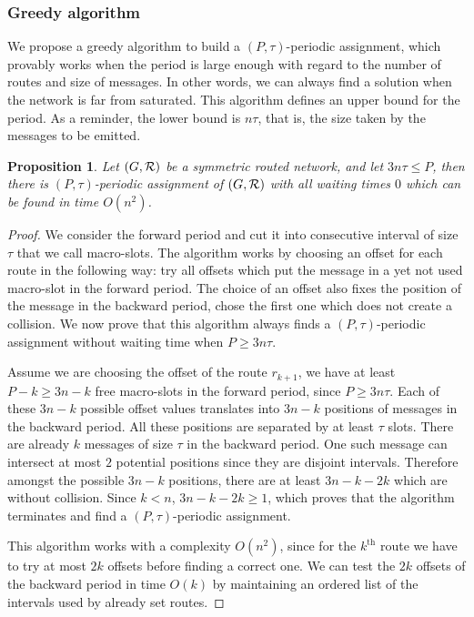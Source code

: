 \documentclass[a4paper,10pt]{article}
\newtheorem{proposition}{Proposition}
\begin{document}
{   
    \subsubsection*{Greedy algorithm}
    
    We propose a greedy algorithm to build a $(P,\tau)$-periodic assignment, which provably works when
    the period is large enough with regard to the number of routes and size of messages. In other words, 
    we can always find a solution when the network is far from saturated. This algorithm defines an upper bound for the period. As a reminder, the lower bound is $n\tau$, that is, the size taken by the messages to be emitted.
    
    \begin{proposition}
     Let $(G, {\cal R})$ be a symmetric routed network, and let $ 3n\tau \leq P$, then there is $(P,\tau)$-periodic assignment of $(G, {\cal R})$ with all waiting times $0$ which can be found in time $O(n^2)$.
    \end{proposition}
    \begin{proof}
     We consider the forward period and cut it into consecutive interval of size $\tau$ that we call macro-slots. The algorithm works by choosing an offset for each route in the following way: try all offsets which put the message in a yet not used macro-slot in the forward
     period. The choice of an offset also fixes the position of the message in the backward period, chose the first one which does not create a collision. We now prove that this algorithm always finds a $(P,\tau)$-periodic assignment without waiting time when $P \geq 3n\tau$.
     
     Assume we are choosing the offset of the route $r_{k+1}$, we have at least $P - k \geq 3n - k$ free macro-slots in the forward period, since $P \geq 3n\tau$. Each of these $3n - k$ possible offset values translates into $3n - k$ positions of messages in the backward period. All these positions are separated by at least $\tau$ slots. There are already $k$ messages of size $\tau$ in the backward period. One such message can intersect at most $2$ potential positions since they are disjoint intervals. Therefore  amongst the possible $3n - k$ positions, there are  at least $3n - k -2k$ which are without collision. Since $k < n$, $3n - k -2k \geq 1$, which proves that the algorithm terminates and find a  $(P,\tau)$-periodic assignment. 
     
     This algorithm works with a complexity $O(n^2)$, since for the $k^{\text{th}}$ route we have to try at most $2k$ offsets before finding a correct one. We can test the $2k$ offsets of the backward period in time $O(k)$ by maintaining an ordered list of the intervals used by already set routes.
     \end{proof}
     
}
\end{document}
